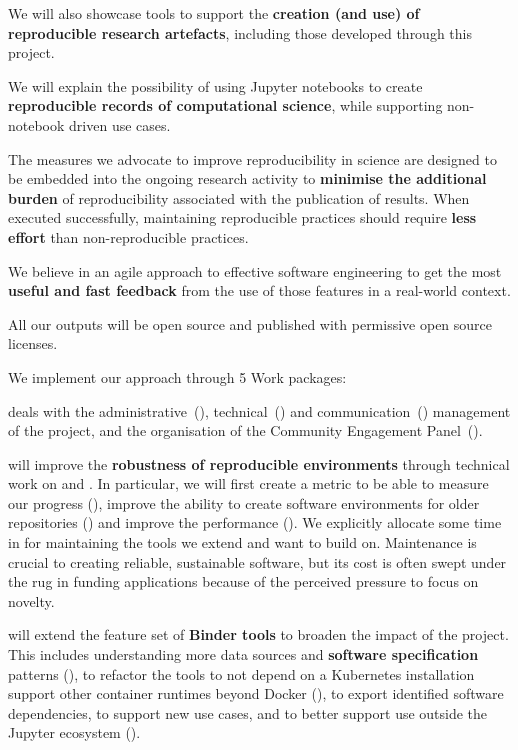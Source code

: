 \begin{compactenum}
  We will also showcase tools to support the \textbf{creation (and use) of reproducible
  research artefacts}, including those developed through this project.
\item We will explain the possibility of using Jupyter notebooks to create
  \textbf{reproducible records of computational science}, while supporting non-notebook
  driven use cases.
\item The measures we advocate to improve reproducibility in science are
  designed to be embedded into the ongoing research activity to \textbf{minimise the
  additional burden} of reproducibility associated with the publication of results.
  When executed successfully, maintaining reproducible practices should require
  \textbf{less effort} than non-reproducible practices.
\item We believe in an agile approach to effective software engineering to get
  the most \textbf{useful and fast feedback} from the use of those features in a real-world context.
\item All our outputs will be open source and published with permissive
  open source licenses.
\end{compactenum}


\medskip
\noindent We implement our approach through 5 Work packages:

 deals with the administrative~(),
technical~() and
communication~() management of the
project, and the organisation of the Community Engagement
Panel~().

 will improve the \textbf{robustness of reproducible
environments} through technical work on \repotodocker{} and \binderhub{}. In
particular, we will first create a metric to be able to measure our progress
(), improve the ability to create
software environments for older repositories
() and improve the
performance (). We
explicitly allocate some time in  for
maintaining the tools we extend and want to build on. Maintenance is crucial
to creating reliable, sustainable software, but its cost is often swept
under the rug in funding applications because of the perceived pressure to
focus on novelty.

 will extend the feature set of \textbf{Binder tools} to broaden
the impact of the project. This
includes understanding more data sources and \textbf{software specification} patterns
(), to refactor the tools to not depend on a
Kubernetes installation support other container runtimes beyond Docker
(), to export identified software dependencies,
to support new use cases, and to
better support use outside the Jupyter ecosystem ().

